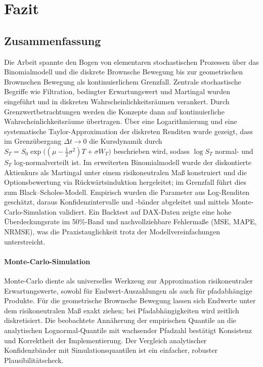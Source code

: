 \section{Fazit}

\subsection{Zusammenfassung}

Die Arbeit spannte den Bogen von elementaren stochastischen Prozessen über das Binomialmodell und die diskrete Brownsche 
Bewegung bis zur geometrischen Brownschen Bewegung als kontinuierlichem Grenzfall. Zentrale stochastische Begriffe wie 
Filtration, bedingter Erwartungswert und Martingal wurden eingeführt und in diskreten Wahrscheinlichkeitsräumen verankert. 
Durch Grenzwertbetrachtungen werden die Konzepte dann auf kontinuierliche Wahrscheinlichkeitsräume übertragen. Über eine 
Logarithmierung und eine systematische Taylor-Approximation der diskreten Renditen wurde gezeigt, dass im Grenzübergang 
$\Delta t \to 0$ die Kursdynamik durch
$S_T = S_0 \exp\!\big((\mu - \tfrac12\sigma^2)T + \sigma W_T\big)$
beschrieben wird, sodass $\log S_T$ normal- und $S_T$ log-normalverteilt ist. Im erweiterten Binomialmodell 
wurde der diskontierte Aktienkurs als Martingal unter einem risikoneutralen Maß konstruiert und die Optionsbewertung 
via Rückwärtsinduktion hergeleitet; im Grenzfall führt dies zum Black–Scholes-Modell. Empirisch wurden die Parameter aus 
Log-Renditen geschätzt, daraus Konfidenzintervalle und -bänder abgeleitet und mittels Monte-Carlo-Simulation validiert. 
Ein Backtest auf DAX-Daten zeigte eine hohe Überdeckungsrate im 50\%-Band und nachvollziehbare Fehlermaße (MSE, MAPE, NRMSE), 
was die Praxistauglichkeit trotz der Modellvereinfachungen unterstreicht.

\paragraph{Monte-Carlo-Simulation}
Monte-Carlo diente als universelles Werkzeug zur Approximation risikoneutraler
Erwartungswerte, sowohl für Endwert-Auszahlungen als auch für pfadabhängige Produkte.
Für die geometrische Brownsche Bewegung lassen sich Endwerte unter dem risikoneutralen Maß exakt ziehen; bei Pfadabhängigkeiten
wird zeitlich diskretisiert. Die beobachtete Annäherung der empirischen Quantile an die
analytischen Lognormal-Quantile mit wachsender Pfadzahl bestätigt Konsistenz und Korrektheit
der Implementierung. Der Vergleich analytischer Konfidenzbänder mit 
Simulationsquantilen ist ein einfacher, robuster Plausibilitätscheck.


